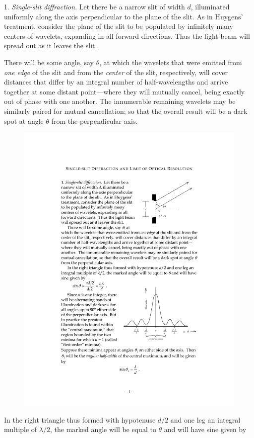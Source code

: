 1. \emph{Single-slit diffraction}. Let there be a narrow slit of width
$d$, illuminated uniformly along the axis perpendicular to the
plane of the slit. As in Huygens' treatment, consider the plane of the
slit to be populated by infinitely many centers of wavelets, expanding
in all forward directions. Thus the light beam will spread out as it
leaves the slit.


There will be some angle, say $\theta$, at which the wavelets that were
emitted from \emph{one edge} of the slit and from the \emph{center} of
the slit, respectively, will cover distances that differ by an integral
number of half-wavelengths and arrive together at some distant
point---where they will mutually cancel, being exactly out of phase with
one another. The innumerable remaining wavelets may be similarly paired
for mutual cancellation; so that the overall result will be a dark spot
at angle $\theta$ from the perpendicular axis.

\begin{figure}
\includegraphics{images/10_heisenberg/Figure2SSD.pdf}
\end{figure}
In the right triangle thus formed with hypotenuse $d/2$ and one leg
an integral multiple of $\lambda/2$, the marked angle will be equal to
$\theta$ and will have sine given by

